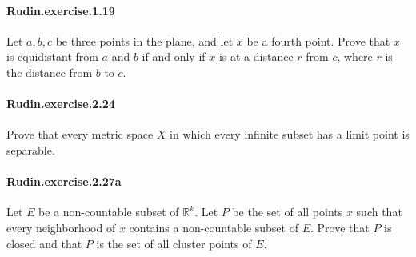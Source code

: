\documentclass{article}
\begin{document}
\paragraph{Rudin.exercise.1.19} Let $a, b, c$ be three points in the plane, and let $x$ be a fourth point. Prove that $x$ is equidistant from $a$ and $b$ if and only if $x$ is at a distance $r$ from $c$, where $r$ is the distance from $b$ to $c$.

\paragraph{Rudin.exercise.2.24} Prove that every metric space $X$ in which every infinite subset has a limit point is separable.

\paragraph{Rudin.exercise.2.27a} Let $E$ be a non-countable subset of $\mathbb{R}^k$. Let $P$ be the set of all points $x$ such that every neighborhood of $x$ contains a non-countable subset of $E$. Prove that $P$ is closed and that $P$ is the set of all cluster points of $E$.
\end{document}
